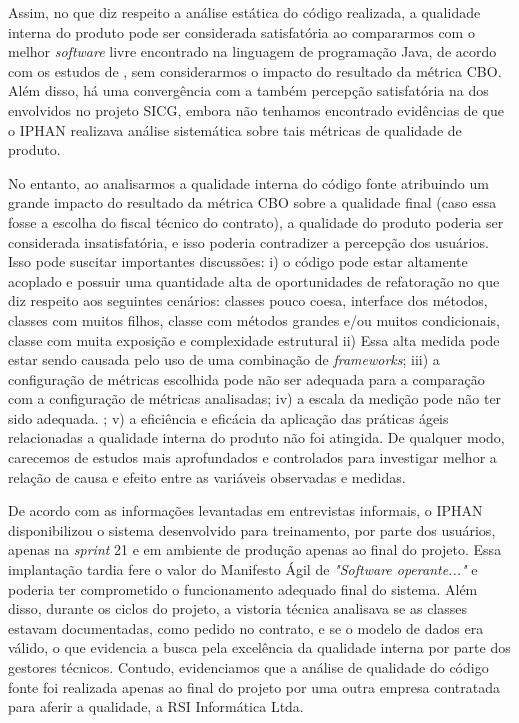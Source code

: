 Assim, no que diz respeito a análise estática do código realizada, a qualidade interna do produto pode ser considerada satisfatória ao compararmos com o melhor \textit{software} livre encontrado na linguagem de programação Java, de acordo com os estudos de , sem considerarmos o impacto do resultado da métrica CBO. Além disso, há uma convergência com a também percepção satisfatória na dos envolvidos no projeto SICG, embora não tenhamos encontrado evidências de que o IPHAN realizava análise sistemática sobre tais métricas de qualidade de produto.

No entanto, ao analisarmos a qualidade interna do código fonte atribuindo um grande impacto do resultado da métrica CBO sobre a qualidade final (caso essa fosse a escolha do fiscal técnico do contrato), a qualidade do produto poderia ser considerada insatisfatória, e isso poderia contradizer a percepção dos usuários. Isso pode suscitar importantes discussões: i) o código pode estar altamente acoplado e possuir uma quantidade alta de oportunidades de refatoração no que diz respeito aos seguintes cenários: classes pouco coesa, interface dos métodos, classes com muitos filhos, classe com métodos grandes e/ou muitos condicionais, classe com muita exposição e complexidade estrutural ii) Essa alta medida pode estar sendo causada pelo uso de uma combinação de \textit{frameworks}; iii) a configuração de métricas escolhida pode não ser adequada para a comparação com a configuração de métricas analisadas; iv) a escala da medição pode não ter sido adequada. ; v) a eficiência e eficácia da aplicação das práticas ágeis relacionadas a qualidade interna do produto não foi atingida. De qualquer modo, carecemos de estudos mais aprofundados e controlados para investigar melhor a relação de causa e efeito entre as variáveis observadas e medidas.

De acordo com as informações levantadas em entrevistas informais, o IPHAN disponibilizou o sistema desenvolvido para treinamento, por parte dos usuários, apenas na \textit{sprint} 21 e em ambiente de produção apenas ao final do projeto. Essa implantação tardia fere o valor do Manifesto Ágil de \textit{"Software operante..."} e poderia ter comprometido o funcionamento adequado final do sistema. Além disso, durante os ciclos do projeto, a vistoria técnica analisava se as classes estavam documentadas, como pedido no contrato, e se o modelo de dados era válido, o que evidencia a busca pela excelência da qualidade interna por parte dos gestores técnicos. Contudo, evidenciamos que a análise de qualidade do código fonte foi realizada apenas ao final do projeto por uma outra empresa contratada para aferir a qualidade, a RSI Informática Ltda. 



